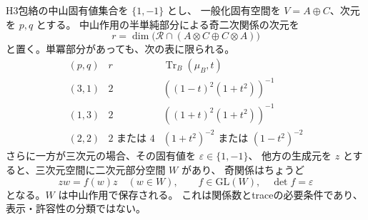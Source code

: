 \begin{proposition}
\label{prop:h3-order2-mixed-rank}
H3包絡の中山固有値集合を $\{1,-1\}$ とし、
一般化固有空間を $V=A\oplus C$、次元を $p,q$ とする。
中山作用の半単純部分による奇二次関係の次元を
\[
 r=\dim\bigl(\mathcal R\cap(A\otimes C\oplus C\otimes A)\bigr)
\]
と置く。単冪部分があっても、次の表に限られる。
\[
\begin{array}{c|c|c}
(p,q)&r&\operatorname{Tr}_B(\mu_B,t)\\\hline
(3,1)&2&((1-t)^2(1+t^2))^{-1}\\
(1,3)&2&((1+t)^2(1+t^2))^{-1}\\
(2,2)&2\text{ または }4&(1+t^2)^{-2}\text{ または }(1-t^2)^{-2}
\end{array}
\]
さらに一方が三次元の場合、その固有値を $\varepsilon\in\{1,-1\}$、
他方の生成元を $z$ とすると、三次元空間に二次元部分空間 $W$ があり、
奇関係はちょうど
\[
 zw=f(w)z\quad(w\in W),\qquad
 f\in\mathrm{GL}(W),\quad \det f=\varepsilon
\]
となる。$W$ は中山作用で保存される。
これは関係数とtraceの必要条件であり、表示・許容性の分類ではない。
\end{proposition}
